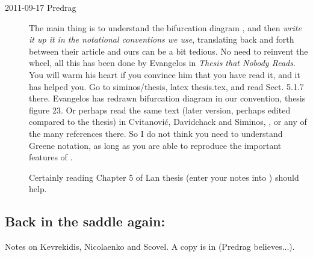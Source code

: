 \begin{description}
\item[2011-09-17 Predrag] The main thing is to understand the bifurcation
diagram , and then \emph{write it up it in the
notational conventions we use}, translating back and forth between their
article and ours can be a bit tedious. No need to reinvent the wheel, all
this has been done by Evangelos in
\emph{
           {Thesis that Nobody Reads}}.
You will warm his heart if you convince him that you have read it, and it
has helped you. Go to siminos/thesis, latex thesis.tex, and read Sect.
5.1.7 there. Evangelos has redrawn bifurcation diagram
 in our convention, thesis figure 23. Or perhaps
read the same text (later version, perhaps edited compared to the thesis)
in Cvitanovi{\'c}, Davidchack and Siminos, ,
or any of the many references there. So I do not think you need to
understand Greene notation, as long as you are able to reproduce the
important features of .

Certainly reading Chapter 5 of  Lan thesis
(enter your notes into ) should help.

\end{description}

\subsection{Back in the saddle again:}
\label{s:KNSks90}

Notes on Kevrekidis, Nicolaenko and Scovel. A copy is in
(Predrag believes...).

